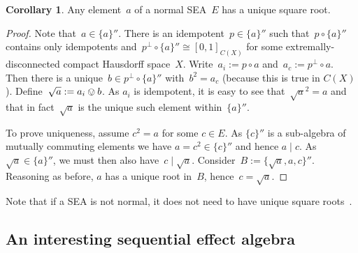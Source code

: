 \documentclass[a4paper, onecolumn, accepted=2020-12-22]{quantumarticle}
\newcommand{\mult}{\mathop{\circ}}
\newcommand{\commu}{\mathrel{\lvert}}
\newcommand{\TODO}[1]{\textcolor{blue}{\emph{[ #1 ]}}}
\newcounter{counter}
\theoremstyle{definition}
\newtheorem{corollary}[counter]{Corollary}
\begin{document}
\begin{corollary}
    Any element~$a$ of a normal SEA~$E$ has a unique square root.
\end{corollary}
\begin{proof}
    Note that~$a \in \{a\}''$.
    There is an idempotent~$p \in \{a\}''$
        such that~$p \mult \{a\}''$ contains only idempotents
        and~$p^\perp \mult \{a\}'' \cong [0,1]_{C(X)}$
            for some extremally-disconnected compact Hausdorff space~$X$.
    Write~$a_i := p \mult a$
        and~$a_c := p^\perp \mult a$.
    Then there is a unique~$b \in p^\perp \mult \{a\}''$ with~$b^2 = a_c$ (because this is true in $C(X)$).
    Define~$\sqrt{a} := a_i \ovee b$.
    As $a_i$ is idempotent, it is easy to see that~$\sqrt{a}^2 = a$
        and that in fact~$\sqrt{a}$ is the unique such element
        within~$\{a\}''$.

    To prove uniqueness, assume $c^2 = a$ for some $c\in E$. As $\{c\}''$ is a sub-algebra of mutually commuting elements we have $a=c^2 \in \{c\}''$ and hence $a\commu c$.
        As~$\sqrt{a} \in \{a\}''$,
        we must then also have~$c \commu \sqrt{a}$.
    Consider~$B := \{\sqrt{a},a, c\}''$.
    Reasoning as before, $a$ has a unique root in~$B$,
        hence~$c = \sqrt{a}$.
\end{proof}

Note that if a SEA is not normal, it does not need to have unique square roots~\cite{shen2010n}.

\subsection{An interesting sequential effect algebra}
\end{document}
